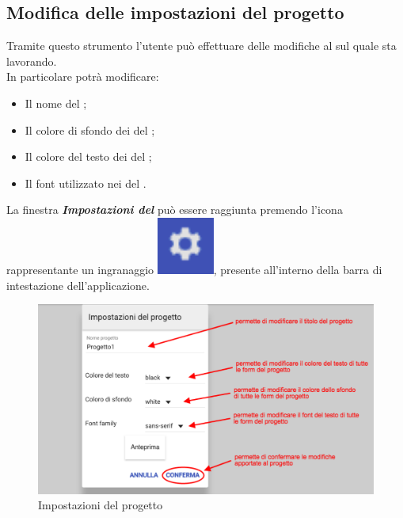 \subsection{Modifica delle impostazioni del progetto}
Tramite questo strumento l'utente può effettuare delle modifiche al  sul quale sta lavorando.\\ In particolare potrà modificare:
\begin{itemize}
\item Il nome del ;
\item Il colore di sfondo dei  del ;
\item Il colore del testo dei  del ;
\item Il font utilizzato nei  del .
\end{itemize}
La finestra \textbf{\textit{Impostazioni del }} può essere raggiunta premendo l'icona rappresentante un ingranaggio
\includegraphics[scale=0.5]{immagini/impostazioniButton.pdf}, presente all'interno della barra di intestazione dell'applicazione.
\begin{figure}[H]
\centering
\includegraphics[scale=0.5]{immagini/impostazioneProgetto.pdf}
\caption{Impostazioni del progetto}
\end{figure}
